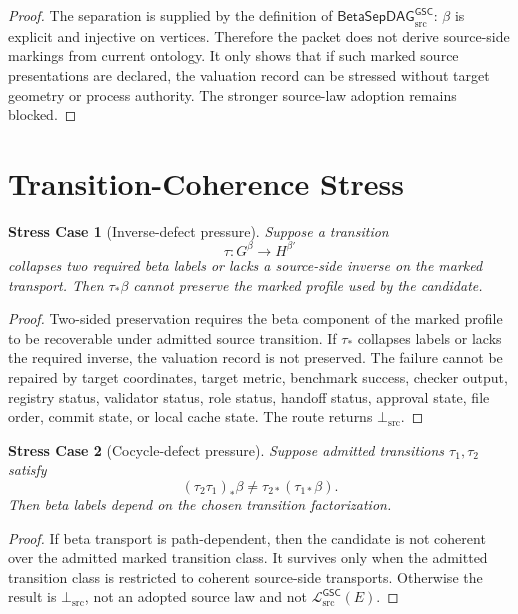 \documentclass[11pt]{article}
\newcommand{\MetricData}{\mathcal{L}_{\mathrm{src}}^{\mathsf{GSC}}}
\newcommand{\BottomSrc}{\bot_{\mathrm{src}}}
\newcommand{\BetaGraph}{\mathsf{BetaSepDAG}_{\mathrm{src}}^{\mathsf{GSC}}}
\newtheorem{stresscase}{Stress Case}
\begin{document}
\begin{proof}
The separation is supplied by the definition of \(\BetaGraph\): \(\beta\) is
explicit and injective on vertices. Therefore the packet does not derive
source-side markings from current ontology. It only shows that if such marked
source presentations are declared, the valuation record can be stressed
without target geometry or process authority. The stronger source-law
adoption remains blocked.
\end{proof}

\section{Transition-Coherence Stress}

\begin{stresscase}[Inverse-defect pressure]
Suppose a transition
\[
  \tau:G^\beta\to H^{\beta'}
\]
collapses two required beta labels or lacks a source-side inverse on the
marked transport. Then \(\tau_\ast\beta\) cannot preserve the marked profile
used by the candidate.
\end{stresscase}

\begin{proof}
Two-sided preservation requires the beta component of the marked profile to be
recoverable under admitted source transition. If \(\tau_\ast\) collapses
labels or lacks the required inverse, the valuation record is not preserved.
The failure cannot be repaired by target coordinates, target metric,
benchmark success, checker output, registry status, validator status, role
status, handoff status, approval state, file order, commit state, or local
cache state. The route returns \(\BottomSrc\).
\end{proof}

\begin{stresscase}[Cocycle-defect pressure]
Suppose admitted transitions \(\tau_1,\tau_2\) satisfy
\[
  (\tau_2\tau_1)_\ast\beta\ne\tau_{2\ast}(\tau_{1\ast}\beta).
\]
Then beta labels depend on the chosen transition factorization.
\end{stresscase}

\begin{proof}
If beta transport is path-dependent, then the candidate is not coherent over
the admitted marked transition class. It survives only when the admitted
transition class is restricted to coherent source-side transports. Otherwise
the result is \(\BottomSrc\), not an adopted source law and not
\(\MetricData(E)\).
\end{proof}
\end{document}
